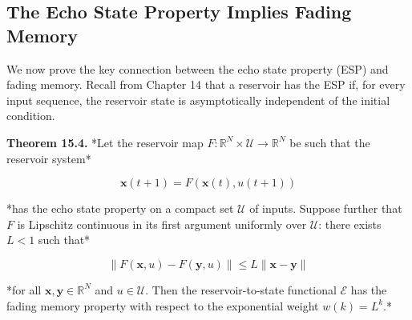 \subsection{The Echo State Property Implies Fading Memory}\label{sec:15.2.2}

We now prove the key connection between the echo state property (ESP) and fading
memory. Recall from Chapter 14 that a reservoir has the ESP if, for every input
sequence, the reservoir state is asymptotically independent of the initial condition.

\textbf{Theorem 15.4.} *Let the reservoir map $F: \mathbb{R}^N \times \mathcal{U} \to \mathbb{R}^N$
be such that the reservoir system*

\[
\mathbf{x}(t+1) = F(\mathbf{x}(t), u(t+1))
\]

*has the echo state property on a compact set $\mathcal{U}$ of inputs. Suppose further
that $F$ is Lipschitz continuous in its first argument uniformly over $\mathcal{U}$:
there exists $L < 1$ such that*

\[
\|F(\mathbf{x}, u) - F(\mathbf{y}, u)\| \leq L\|\mathbf{x} - \mathbf{y}\|
\]

*for all $\mathbf{x}, \mathbf{y} \in \mathbb{R}^N$ and $u \in \mathcal{U}$. Then the
reservoir-to-state functional $\mathcal{E}$ has the fading memory property with respect
to the exponential weight $w(k) = L^k$.*

